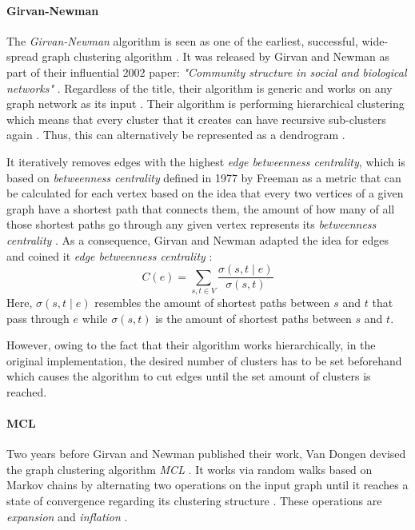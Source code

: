 \documentclass[12pt,a4paper]{report}
\begin{document}
\paragraph{Girvan-Newman \cite{girvan2002community}}
The \textit{Girvan-Newman} algorithm is seen as one of the earliest, successful,
wide-spread graph clustering algorithm \cite{lancichinetti2009community}.
It was released by Girvan and Newman as part of their influential 2002 paper:
\textit{"Community structure in social and biological networks"} \cite{girvan2002community}.
Regardless of the title, their algorithm is generic and works on any graph network
as its input \cite{lancichinetti2009community}.
Their algorithm is performing hierarchical clustering which means that
every cluster that it creates can have recursive sub-clusters
again \cite{girvan2002community}.
Thus, this can alternatively be represented as a dendrogram \cite{newman2004fast}.

It iteratively removes edges with the highest
\textit{edge betweenness centrality}, which is based on
\textit{betweenness centrality} defined in 1977 by Freeman as
a metric that can be calculated for each vertex based on the idea that every
two vertices of a given graph have a shortest path that connects them,
the amount of how many of all those shortest paths go through any given vertex
represents its \textit{betweenness centrality} \cite{freeman1977set}.
As a consequence, Girvan and Newman adapted the idea for edges and coined it
\textit{edge betweenness centrality} \cite{girvan2002community}:
\[
  C(e) = \sum_{s, t \in V} \frac{\sigma(s, t \mid e)}{\sigma(s, t)}
\]
Here, \(\sigma(s, t \mid e)\) resembles the amount of shortest paths
between \(s\) and \(t\) that pass through \(e\) while \(\sigma(s, t)\)
is the amount of shortest paths between \(s\) and \(t\).

However, owing to the fact that their algorithm works hierarchically,
in the original implementation, the desired number of clusters has to be set
beforehand which causes the algorithm to cut edges until the set amount of
clusters is reached.

\paragraph{MCL \cite{vandongen2000graph}}
Two years before Girvan and Newman published their work, Van Dongen devised
the graph clustering algorithm \textit{MCL} \cite{vandongen2000graph}.
It works via random walks based on Markov chains by alternating two operations
on the input graph until it reaches a state of convergence regarding its
clustering structure \cite{vandongen2000graph}. These operations are
\textit{expansion} and \textit{inflation} \cite{vandongen2000graph}.
\end{document}
